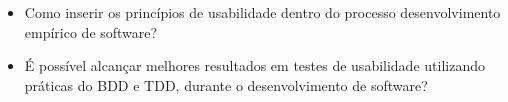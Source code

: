 \begin{itemize}
\item Como inserir os princípios de usabilidade dentro do processo desenvolvimento empírico de software?
\item É possível alcançar melhores resultados em testes de usabilidade utilizando práticas do BDD e TDD, durante o desenvolvimento de software?
\end{itemize}

\begin{comment}
Segundo ~\citeonline{siegel2010} para ser defensor de UX você não precisa criar  \textit{mockups} perfeitos no Inkscape \footnote{Inkscape - Aplicativo de edição de imagens} e nem ter um bom conhecimento de HCI. Para ele tudo que você precisa é de amor por um projeto open source e as pessoas que a usam, sendo paciente, persistente e persuasivo.É útil ter alguém com conhecimento em experiência do usuário mas muitas vezes é desnecessário. É melhor para um projeto open source ter um defensor UX novato do que nenhum.

	Os defensores em usabilidade não precisam ser desenvolvedores e nem sequer precisa ser um especialista em usabilidade. É preciso tempo, energia e diposição para obter uma boa experiência do usuário. O defensor de UX pode filtrar e priorizar erros UX, pesquisar problemas de design e realizar testes com os usuário ~\cite{day2010}.

	Muitos desenvolvedores de software livre já sabem da importância da usabilidade, mas não sabem como melhorá-la. ~\citeonline{andreasen2006} diz que um grande problema de se trabalhar com eles é a falta de confiança e por isso é preciso comunicar abertamente suas descobertas e métodos. 

	Gravação de testes de usabilidade ou entrevistas para ter citações de usuários para apresentação é uma prática comum em agências de usabilidade no qual é necessário assinar um formulário de concessão de uso da imagem. Para ~\citeonline{borchardt2011} em projetos de software livre independentes, as gravações de participantes são bastante inúteis, pois criam muito trabalho apenas para apresentação, além de que rever as gravações levaria o dobro de tempo.

	No desenvolvimento de software livre uma das vantagens na apresentação dos resultados de forma rápida e sem a necessidade de elaborar um relatório um uma apresentação. A comunicação pode ser feita diretamente com os desenvolvedores sobre os problemas encontrados e fazer iterações rápidas com base em sugestões ~\cite{borchardt2011}.
\end{comment}

